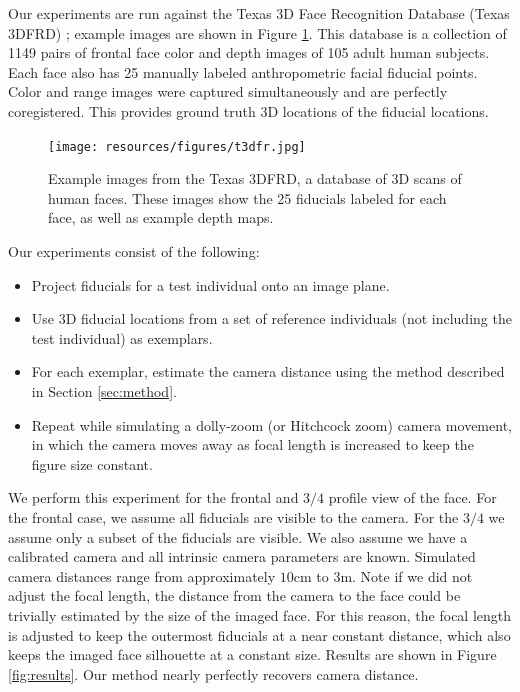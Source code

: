 \documentclass[runningheads]{llncs}
\begin{document}
Our experiments are run against the Texas 3D Face Recognition Database (Texas 3DFRD) \cite{gupta2010texas}; example images are shown in Figure \ref{fig:t3dfrd}.  
This database is a collection of 1149 pairs of frontal face color and depth images of 105 adult human subjects.  
Each face also has 25 manually labeled anthropometric facial fiducial points.  
Color and range images were captured simultaneously and are perfectly coregistered.  
This provides ground truth 3D locations of the fiducial locations.  

\begin{figure}[h]
\centering
\texttt{[image: resources/figures/t3dfr.jpg]}
\caption{
Example images from the Texas 3DFRD, a database of 3D scans of human faces.
These images show the 25 fiducials labeled for each face, as well as example depth maps.
}
\label{fig:t3dfrd}
\end{figure}

Our experiments consist of the following:
\begin{itemize}
\item Project fiducials for a test individual onto an image plane.
\item Use 3D fiducial locations from a set of reference individuals (not including the test individual) as exemplars.
\item For each exemplar, estimate the camera distance using the method described in Section \ref{sec:method}.
\item Repeat while simulating a dolly-zoom (or Hitchcock zoom) camera movement, in which the camera moves away as focal length is increased to keep the figure size constant.
\end{itemize}

We perform this experiment for the frontal and $3/4$ profile view of the face.  
For the frontal case, we assume all fiducials are visible to the camera.  
For the $3/4$ we assume only a subset of the fiducials are visible. 
We also assume we have a calibrated camera and all intrinsic camera parameters are known.  
Simulated camera distances range from approximately $10$cm to $3$m.
Note if we did not adjust the focal length, the distance from the camera to the face could be trivially estimated by the size of the imaged face. 
For this reason, the focal length is adjusted to keep the outermost fiducials at a near constant distance, which also keeps the imaged face silhouette at a constant size.
Results are shown in Figure \ref{fig:results}.
Our method nearly perfectly recovers camera distance.
\end{document}
